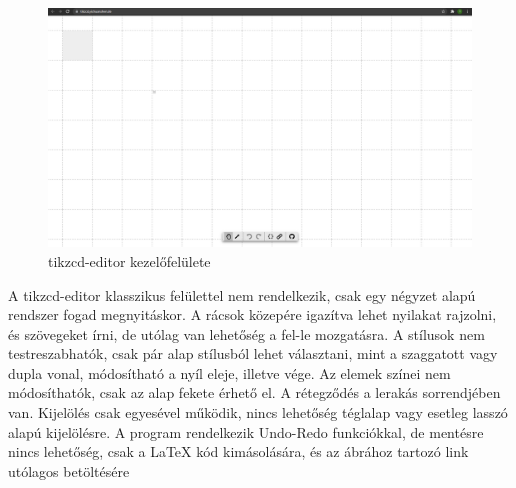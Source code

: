 \begin{figure}[!h]
	\includegraphics[width=\textwidth]{images/tikzcd.png}
	\caption{tikzcd-editor kezelőfelülete}
	\label{fig:tikzcd}
\end{figure}
A tikzcd-editor klasszikus felülettel nem rendelkezik, csak egy négyzet alapú rendszer fogad megnyitáskor. A rácsok közepére igazítva lehet nyilakat rajzolni, és szövegeket írni, de utólag van lehetőség a fel-le mozgatásra. A stílusok nem testreszabhatók, csak pár alap stílusból lehet választani, mint a szaggatott vagy dupla vonal, módosítható a nyíl eleje, illetve vége. Az elemek színei nem módosíthatók, csak az alap fekete érhető el. A rétegződés a lerakás sorrendjében van. Kijelölés csak egyesével működik, nincs lehetőség téglalap vagy esetleg lasszó alapú kijelölésre. A program rendelkezik Undo-Redo funkciókkal, de mentésre nincs lehetőség, csak a LaTeX kód kimásolására, és az ábrához tartozó link utólagos betöltésére



